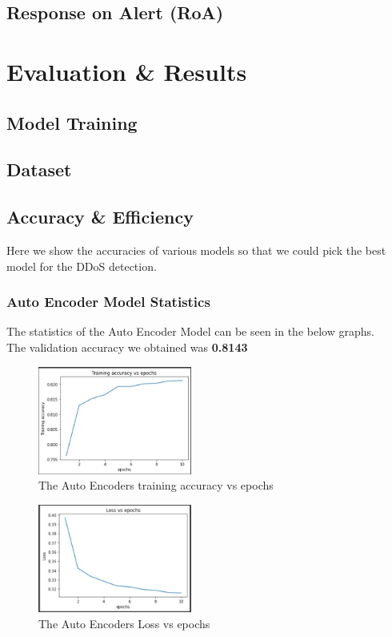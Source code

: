 \documentclass[10pt,twocolumn,letterpaper]{article}
\begin{document}
\subsection{Response on Alert (RoA)}

\section{Evaluation \& Results}

\subsection{Model Training}

\subsection{Dataset}

\subsection{Accuracy \& Efficiency}
Here we show the accuracies of various models so that we could pick the best model for the DDoS detection. 

\subsubsection{Auto Encoder Model Statistics}
The statistics of the Auto Encoder Model can be seen in the below graphs.\\
The validation accuracy we obtained was \textbf{0.8143}
\begin{figure}[h]
    \includegraphics[width = 0.45\textwidth]{src/img/graphs/an_acc.jpg}
    \caption{The Auto Encoders training accuracy vs epochs}
    \label{fig:incep}
\end{figure}

\begin{figure}[h]
    \includegraphics[width = 0.45\textwidth]{src/img/graphs/an_loss.jpg}
    \caption{The Auto Encoders Loss vs epochs}
    \label{fig:incep}
\end{figure}
\end{document}
